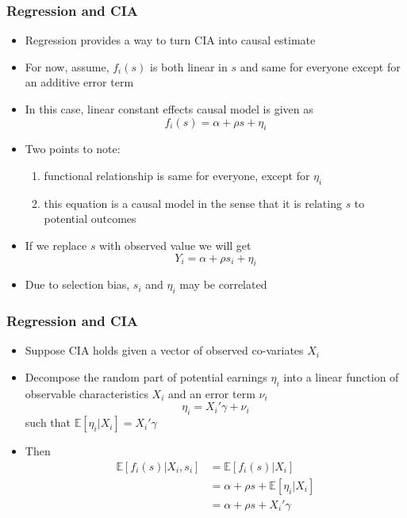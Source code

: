 \documentclass{beamer}
\theoremstyle{plain}
\begin{document}
\begin{frame}
\frametitle{Regression and CIA}
\begin{itemize}
	\item Regression provides a way to turn CIA into causal estimate
	\item For now, assume, $f_i(s)$ is both linear in $s$ and same for everyone except for an additive error term
	\item In this case, linear constant effects causal model is given as 
	$$ f_i(s) = \alpha + \rho s + \eta_i$$
	\item Two points to note:
		\begin{enumerate}
				\item functional relationship is same for everyone, except for $\eta_i$
				\item this equation is a causal model in the sense that it is relating $s$ to potential outcomes
			\end{enumerate}
	\item If we replace $s$ with observed value we will get 
		$$ Y_i = \alpha + \rho s_i + \eta_i $$
	\item Due to selection bias, $s_i$ and $\eta_i$ may be correlated
\end{itemize}
\end{frame}

\begin{frame}
\frametitle{Regression and CIA}
\begin{itemize}
	\item Suppose CIA holds given a vector of observed co-variates $X_i$
	\item Decompose the random part of potential earnings $\eta_i$ into a linear function of observable characteristics $X_i$ and an error term $\nu_i$
		$$\eta_i = X_i'\gamma + \nu_i $$
	such that $\mathbb E[\eta_i | X_i] = X_i'\gamma$
	\item Then
		\begin{align*}
			\mathbb E[f_i(s)| X_i, s_i] &= \mathbb E[f_i(s)| X_i]\\
										&= \alpha + \rho s + \mathbb E[\eta_i | X_i]\\
										&= \alpha + \rho s + X_i'\gamma
			\end{align*}
\end{itemize}
\end{frame}
\end{document}
